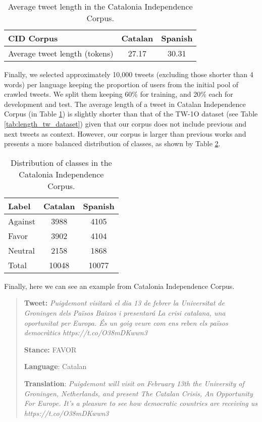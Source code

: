 \documentclass[10pt, a4paper]{article}
\begin{document}
\begin{table}[!ht]
\centering
\begin{tabular}{lcc} \hline
CID Corpus & Catalan & Spanish \\ \hline
Average tweet length (tokens)& 27.17 & 30.31 \\ \hline
\end{tabular}
\caption{Average tweet length in the Catalonia Independence Corpus.}\label{tab:length_ind_dataset}
\end{table}

Finally, we selected approximately 10,000 tweets (excluding those shorter than 4 words) per language keeping the proportion of users from the initial pool of crawled tweets. We split them keeping 60\% for training, and 20\% each for development and test. The average length of a tweet in Catalan Independence Corpus (in Table \ref{tab:length_ind_dataset}) is slightly shorter than that of the TW-1O dataset (see Table \ref{tab:length_tw_dataset}) given that our corpus does not include previous and next tweets as context. However, our corpus is larger than previous works \cite{mohammad-etal-2016-semeval,taule18} and presents a more balanced distribution of classes, as shown by Table \ref{tab:distr_dataset}.

\begin{table}[!ht]
\centering
\begin{tabular}{lcc}\hline
Label & Catalan & Spanish \\ \hline
Against & 3988 & 4105 \\
Favor & 3902 & 4104 \\
Neutral & 2158 & 1868 \\ \hline
Total & 10048 & 10077 \\ \hline
\end{tabular}
\caption{Distribution of classes in the Catalonia Independence Corpus.}\label{tab:distr_dataset}
\end{table}

Finally, here we can see an example from Catalonia Independence Corpus.

\begin{quote}
\textbf{Tweet:} \textit{Puigdemont visitar\`a el dia 13 de febrer la Universitat de Groningen dels Pa\"isos Baixos i presentar\'a  La crisi catalana, una oportunitat per Europa. \'Es un goig veure com ens reben els pa\"isos democr\`atics https://t.co/O38mDKwwn3}

\textbf{Stance:} FAVOR

\textbf{Language}: Catalan

\textbf{Translation}: \textit{Puigdemont will visit
on February 13th the University of Groningen, Netherlands, and present The Catalan Crisis, An Opportunity For Europe.
It's a pleasure to see how democratic countries are receiving us https://t.co/O38mDKwwn3}
\end{quote}
\end{document}
